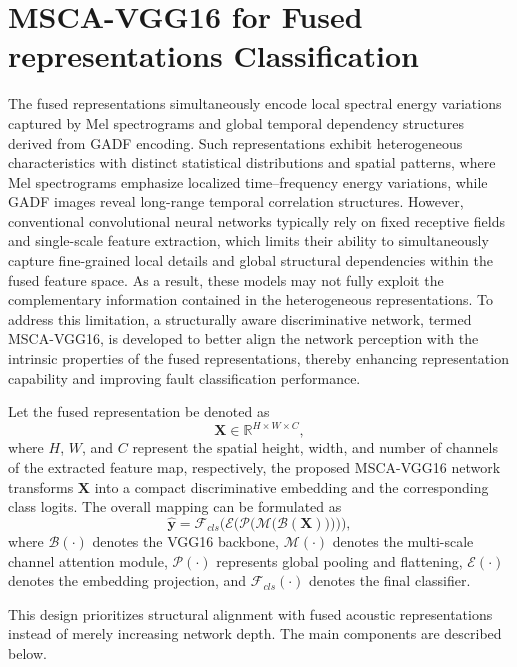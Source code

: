 \documentclass[journal]{IEEEtran}
\begin{document}
\section{MSCA-VGG16 for Fused representations Classification}
\label{section4}
The fused representations simultaneously encode local spectral energy variations captured by Mel spectrograms and global temporal dependency structures derived from GADF encoding. Such representations exhibit heterogeneous characteristics with distinct statistical distributions and spatial patterns, where Mel spectrograms emphasize localized time–frequency energy variations, while GADF images reveal long-range temporal correlation structures. However, conventional convolutional neural networks typically rely on fixed receptive fields and single-scale feature extraction, which limits their ability to simultaneously capture fine-grained local details and global structural dependencies within the fused feature space. As a result, these models may not fully exploit the complementary information contained in the heterogeneous representations. To address this limitation, a structurally aware discriminative network, termed MSCA-VGG16, is developed to better align the network perception with the intrinsic properties of the fused representations, thereby enhancing representation capability and improving fault classification performance.

Let the fused representation be denoted as 
\begin{equation}
	\boldsymbol{X} \in \mathbb{R}^{H \times W \times C},
\end{equation}
where $H$, $W$, and $C$ represent the spatial height, width, and number of channels of the extracted feature map, respectively, the proposed MSCA-VGG16 network transforms $\boldsymbol{X}$ into a compact discriminative embedding and the corresponding class logits. The overall mapping can be formulated as
\begin{equation}
	\hat{\mathbf{y}} = \mathcal{F}_{cls}\big(\mathcal{E}\big(\mathcal{P}\big(\mathcal{M}\big(\mathcal{B}(\boldsymbol{X})\big)\big)\big)\big),
	\label{eq:cls_pipeline}
\end{equation}
where $\mathcal{B}(\cdot)$ denotes the VGG16 backbone, $\mathcal{M}(\cdot)$ denotes the multi-scale channel attention module, $\mathcal{P}(\cdot)$ represents global pooling and flattening, $\mathcal{E}(\cdot)$ denotes the embedding projection, and $\mathcal{F}_{cls}(\cdot)$ denotes the final classifier.

This design prioritizes structural alignment with fused acoustic representations instead of merely increasing network depth. The main components are described below.
\end{document}
